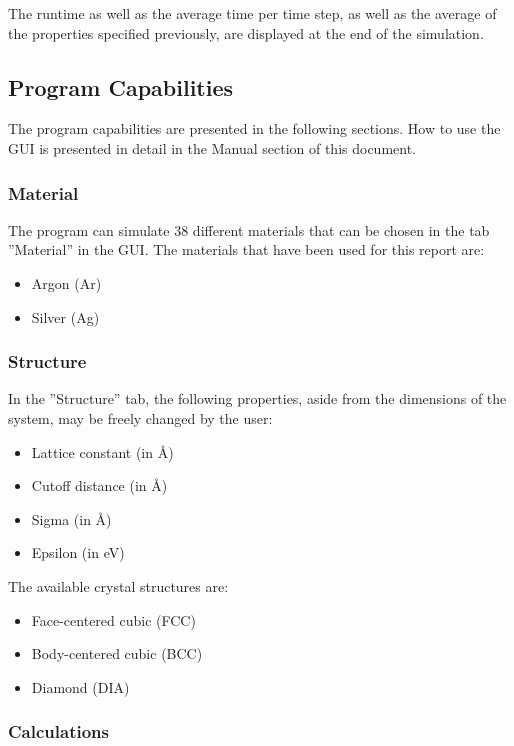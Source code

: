 The runtime as well as the average time per time step, as well as the average of the properties specified previously, are displayed at the end of the simulation.

\subsection{Program Capabilities}

The program capabilities are presented in the following sections. How to use the GUI is presented in detail in the Manual section of this document.

\subsubsection{Material}

The program can simulate 38 different materials that can be chosen in the tab ''Material'' in the GUI. The materials that have been used for this report are:

\begin{itemize}
\item Argon (Ar) 
\item Silver (Ag)
\end{itemize}

\subsubsection{Structure}

In the ''Structure'' tab, the following properties, aside from the dimensions of the system, may be freely changed by the user:

\begin{itemize}
\item Lattice constant (in \AA) 
\item Cutoff distance (in \AA)
\item Sigma (in \AA) 
\item Epsilon (in eV)
\end{itemize}

The available crystal structures are:
\begin{itemize}
\item Face-centered cubic (FCC) 
\item Body-centered cubic (BCC)
\item Diamond (DIA)
\end{itemize}

\subsubsection{Calculations}

